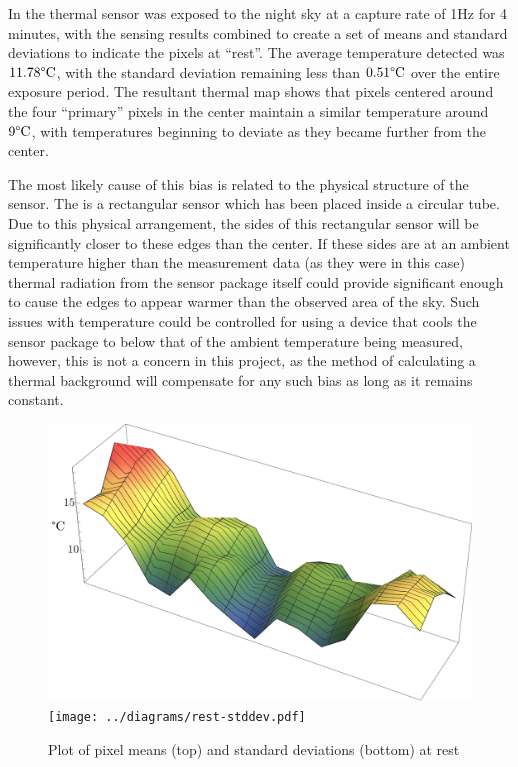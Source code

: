 \documentclass[../thesis/thesis.tex]{subfiles}
\begin{document}
In  the thermal sensor was exposed to the night sky at a capture rate of 1Hz for 4 minutes, with the sensing results combined to create a set of means and standard deviations to indicate the pixels at ``rest''. The average temperature detected was $11.78\degree\textrm{C}$, with the standard deviation remaining less than $0.51\degree\textrm{C}$ over the entire exposure period. The resultant thermal map shows that pixels centered around the four ``primary'' pixels in the center maintain a similar temperature around $9\degree\textrm{C}$, with temperatures beginning to deviate as they became further from the center.

The most likely cause of this bias is related to the physical structure of the sensor. The \mlx is a rectangular sensor which has been placed inside a circular tube. Due to this physical arrangement, the sides of this rectangular sensor will be significantly closer to these edges than the center. If these sides are at an ambient temperature higher than the measurement data (as they were in this case) thermal radiation from the sensor package itself could provide significant enough to cause the edges to appear warmer than the observed area of the sky. Such issues with temperature could be controlled for using a device that cools the sensor package to below that of the ambient temperature being measured, however, this is not a concern in this project, as the method of calculating a thermal background will compensate for any such bias as long as it remains constant.

\begin{figure}
\centering
\includegraphics[width=\textwidth]{../diagrams/rest-avg.pdf}
\texttt{[image: ../diagrams/rest-stddev.pdf]}
\caption{Plot of pixel means (top) and standard deviations (bottom) at rest}
\label{fig:meanstdplot}
\end{figure}
\end{document}
